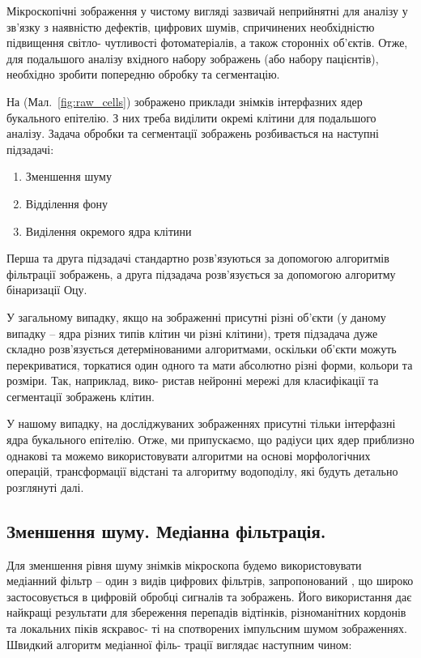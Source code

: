 \par
Мікроскопічні зображення у чистому вигляді зазвичай неприйнятні для аналізу у зв’язку з наявністю дефектів, цифрових шумів, спричинених необхідністю підвищення світло- чутливості фотоматеріалів, а також сторонніх об’єктів. Отже, для подальшого аналізу вхідного набору зображень (або набору пацієнтів), необхідно зробити попередню обробку та сегментацію.

\par
На (Мал.~\ref{fig:raw_cells}) зображено приклади знімків інтерфазних ядер букального епітелію. З них треба виділити окремі клітини для подальшого аналізу. Задача обробки та сегментації зображень розбивається на наступні підзадачі:

\begin{enumerate}
	\item Зменшення шуму
	\item Відділення фону
	\item Виділення окремого ядра клітини
\end{enumerate}

\par
Перша та друга підзадачі стандартно розв’язуються за допомогою алгоритмів фільтрації зображень, а друга підзадача розв’язується за допомогою алгоритму бінаризації Оцу. 

У загальному випадку, якщо на зображенні присутні різні об'єкти (у даному випадку -- ядра різних типів клітин чи різні клітини), третя підзадача дуже складно розв’язується детермінованими алгоритмами, оскільки об'єкти можуть перекриватися, торкатися один одного та мати абсолютно різні форми, кольори та розміри. Так, наприклад, \citep{bib:cellcount} вико- ристав нейронні мережі для класифікації та сегментації зображень клітин.

У нашому випадку, на досліджуваних зображеннях присутні тільки інтерфазні ядра букального епітелію. Отже, ми припускаємо, що радіуси цих ядер приблизно однакові та можемо використовувати алгоритми на основі морфологічних операцій, трансформації відстані та алгоритму водоподілу, які будуть детально розглянуті далі.

\subsection{Зменшення шуму. Медіанна фільтрація.}

Для зменшення рівня шуму знімків мікроскопа будемо використовувати медіанний фільтр -- один з видів цифрових фільтрів, запропонований \citep{bib:medianfilter}, що широко застосовується в цифровій обробці сигналів та зображень. Його використання дає найкращі результати для збереження перепадів відтінків, різноманітних кордонів та локальних піків яскравос- ті на спотворених імпульсним шумом зображеннях. Швидкий алгоритм медіанної філь- 	трації виглядає наступним чином:


